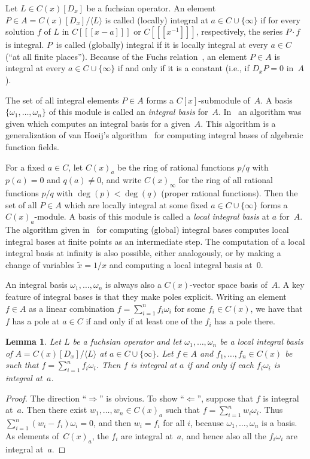 \documentclass{sig-alternate}
\newtheorem{lemma}[theorem]{Lemma}
\def\<#1>{\langle#1\rangle}
\begin{document}
Let $L\in C(x)[D_x]$ be a fuchsian operator. An element $P\in A=C(x)[D_x]/\<L>$
is called (locally) integral at $a\in C\cup\{\infty\}$ if for every solution $f$
of $L$ in $C[[[x-a]]]$ or $C[[[x^{-1}]]]$, respectively, the series $P\cdot f$ is
integral. $P$~is called (globally) integral if it is locally integral at every
$a\in C$ (``at all finite places''). Because of the Fuchs relation~\cite{ince26}, an
element $P\in A$ is integral at every $a\in C\cup\{\infty\}$ if and only if it
is a constant (i.e., if $D_xP=0$ in~$A$).

The set of all integral elements $P\in A$ forms a $C[x]$-submodule of~$A$.
A basis $\{\omega_1,\dots,\omega_n\}$ of this module is called an \emph{integral basis}
for~$A$. In~\cite{kauers15b} an algorithm was given which computes an integral basis
for a given~$A$. This algorithm is a generalization of van Hoeij's
algorithm~\cite{vanHoeij94} for computing integral bases of algebraic function
fields.

For a fixed $a\in C$, let $C(x)_a$ be the ring of rational functions $p/q$
with $p(a)=0$ and $q(a)\neq0$, and write $C(x)_\infty$ for the ring of all
rational functions $p/q$ with $\deg(p)<\deg(q)$ (proper rational
functions). Then the set of all $P\in A$ which are locally integral at some
fixed $a\in C\cup\{\infty\}$ forms a $C(x)_a$-module. A basis of this module is
called a \emph{local integral basis} at $a$ for~$A$. The algorithm given in~\cite{kauers15b}
for computing (global) integral bases computes local integral bases at finite
points as an intermediate step. The computation of a local integral basis at
infinity is also possible, either analogously, or by making a change of
variables $\tilde x=1/x$ and computing a local integral basis at~$0$.

An integral basis $\omega_1,\dots,\omega_n$ is always also a $C(x)$-vector space
basis of~$A$. A key feature of integral bases is that they make poles explicit. Writing
an element $f\in A$ as a linear combination $f=\sum_{i=1}^n f_i\omega_i$ for some
$f_i\in C(x)$, we have that $f$ has a pole at $a\in C$ if and only if at least one
of the $f_i$ has a pole there.

\begin{lemma}\label{lemma:1}
  Let $L$ be a fuchsian operator and let
  $\omega_1,\dots,\omega_n$ be a local integral basis of $A=C(x)[D_x]/\<L>$ at $a\in C\cup\{\infty\}$.
  Let $f\in A$ and $f_1,\dots,f_n\in C(x)$ be such that $f=\sum_{i=1}^nf_i\omega_i$.
  Then $f$ is integral at $a$ if and only if each $f_i\omega_i$ is integral at~$a$.
\end{lemma}
\begin{proof}
  The direction ``$\Rightarrow$'' is obvious. To show ``$\Leftarrow$'', suppose
  that $f$ is integral at~$a$. Then there exist $w_1,\dots,w_n\in C(x)_a$ such that
  $f=\sum_{i=1}^nw_i\omega_i$. Thus $\sum_{i=1}^n(w_i-f_i)\omega_i=0$, and then
  $w_i=f_i$ for all $i$, because $\omega_1,\dots,\omega_n$ is a basis.
  As elements of~$C(x)_a$, the $f_i$ are integral at~$a$, and hence also all the $f_i\omega_i$
  are integral at~$a$.
\end{proof}
\end{document}

